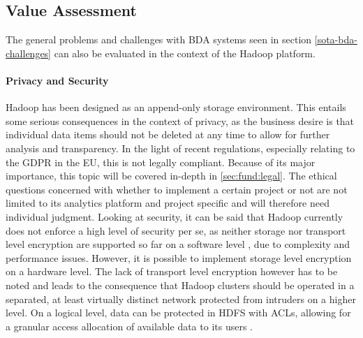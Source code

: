 \subsection{Value Assessment}
\label{hadoop-assessment}
The general problems and challenges with \ac{BDA} systems seen in section  \vref{sota-bda-challenges}
can also be evaluated in the context of the Hadoop platform.

\paragraph{Privacy and Security}
Hadoop has been designed as an append-only storage environment. 
This entails some serious consequences in the context of privacy, as the business desire is that individual data items should not be deleted at any time to allow for further analysis and transparency. 
In the light of recent regulations, especially relating to the \ac{GDPR} in the \ac{EU}, this is not legally compliant. 
Because of its major importance, this topic will be covered in-depth in \vref{sec:fund:legal}. The ethical questions concerned with whether to implement a certain project or not are not limited to its analytics platform and project specific and will therefore need individual judgment. 
Looking at security, it can be said that Hadoop currently does not enforce a high level of security per se, 
as neither storage nor transport level encryption are supported so far on a software level \autocite[p.~82]{rajasekar2015survey}, due to complexity and performance issues. 
However, it is possible to implement storage level encryption on a hardware level. The lack of transport level encryption however has to be noted and leads to the consequence that Hadoop clusters should be operated in a separated, 
at least virtually distinct network protected from intruders on a higher level.
On a logical level, data can be protected in \ac{HDFS} with \acp{ACL}, allowing for a granular access allocation of available data to its users \autocite{hdfspermissions}.


